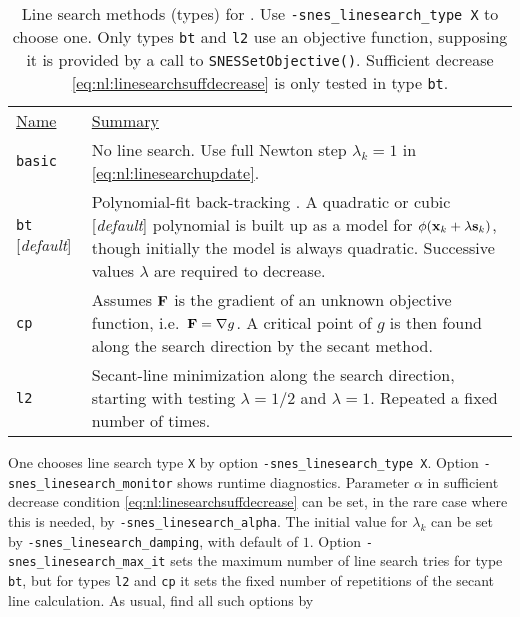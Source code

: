 \begin{table}
\begin{tabular}{ll}
\underline{Name} & \underline{Summary} \vspace{0.05in} \\ \vspace{0.1in}
\texttt{basic} & No line search.  Use full Newton step $\lambda_k=1$ in \eqref{eq:nl:linesearchupdate}. \\ \vspace{0.1in}
\texttt{bt} [\emph{default}] & \begin{minipage}[t]{0.8\textwidth}
Polynomial-fit back-tracking \citep[section 6.3.2]{DennisSchnabel1983}.  A quadratic or cubic [\emph{default}] polynomial is built up as a model for \mbox{$\phi(\mathbf{x}_k+\lambda \mathbf{s}_k)$}, though initially the model is always quadratic.  Successive values $\lambda$ are required to decrease.
\end{minipage} \\ \vspace{0.1in}
\texttt{cp} & \begin{minipage}[t]{0.83\textwidth}
Assumes $\mathbf{F}$ is the gradient of an unknown objective function, i.e.~\mbox{$\mathbf{F}=\nabla g$}.  A critical point of $g$ is then found along the search direction by the secant method.
\end{minipage} \\ \vspace{0.1in}
\texttt{l2} & \begin{minipage}[t]{0.83\textwidth}
Secant-line minimization along the search direction, starting with testing \mbox{$\lambda=1/2$} and \mbox{$\lambda=1$}. Repeated a fixed number of times.
\end{minipage}
\end{tabular}
\caption{Line search methods (types) for \pSNES.  Use \texttt{-snes\_linesearch\_type X} to choose one.  Only types \texttt{bt} and \texttt{l2} use an objective function, supposing it is provided by a call to \texttt{SNESSetObjective()}.  Sufficient decrease \eqref{eq:nl:linesearchsuffdecrease} is only tested in type \texttt{bt}.} \label{tab:nl:linesearchoptions}
\end{table}

One chooses line search type \texttt{X} by option \texttt{-snes\_linesearch\_type X}.  Option \texttt{-snes\_linesearch\_monitor} shows runtime diagnostics.  Parameter $\alpha$ in sufficient decrease condition \eqref{eq:nl:linesearchsuffdecrease} can be set, in the rare case where this is needed, by \texttt{-snes\_linesearch\_alpha}.  The initial value for $\lambda_k$ can be set by \texttt{-snes\_linesearch\_damping}, with default of $1$.  Option \texttt{-snes\_linesearch\_max\_it} sets the maximum number of line search tries for type \texttt{bt}, but for types \texttt{l2} and \texttt{cp} it sets the fixed number of repetitions of the secant line calculation.  As usual, find all such options by

